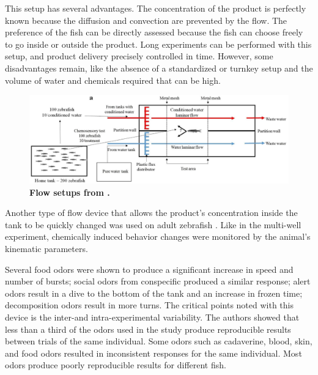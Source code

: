     This setup has several advantages. The concentration of the product is perfectly known because the diffusion and convection are prevented by the flow. The preference of the fish can be directly assessed because the fish can choose freely to go inside or outside the product. Long experiments can be performed with this setup, and product delivery precisely controlled in time. However, some disadvantages remain, like the absence of a standardized or turnkey setup and the volume of water and chemicals required that can be high.

    \begin{figure}[h]
      \centering
      \includegraphics[width=1\textwidth]{part_2/assets/flow_0.png}
      \caption{\textbf{Flow setups from \cite{abreu2016behavioral}.}}
      \label{flow_0_setup}
    \end{figure}

    Another type of flow device that allows the product's concentration inside the tank to be quickly changed was used on adult zebrafish \cite{kermen2020stimulus}. Like in the multi-well experiment, chemically induced behavior changes were monitored by the animal's kinematic parameters.

    Several food odors were shown to produce a significant increase in speed and number of bursts; social odors from conspecific produced a similar response; alert odors result in a dive to the bottom of the tank and an increase in frozen time; decomposition odors result in more turns. The critical points noted with this device is the inter-and intra-experimental variability. The authors showed that less than a third of the odors used in the study produce reproducible results between trials of the same individual. Some odors such as cadaverine, blood, skin, and food odors resulted in inconsistent responses for the same individual. Most odors produce poorly reproducible results for different fish.

